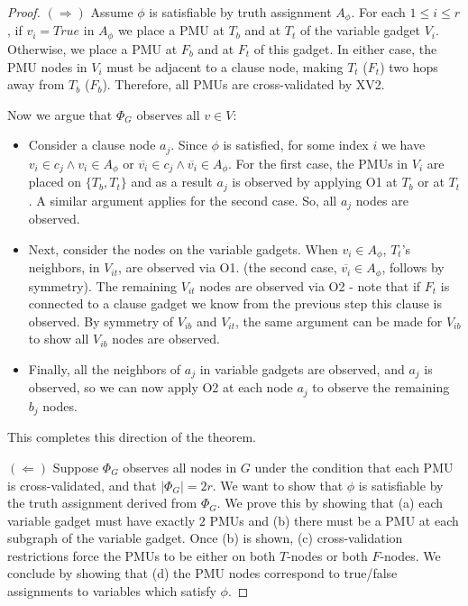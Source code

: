 \begin{proof}
$(\Rightarrow)$ Assume $\phi$ is satisfiable by truth assignment $A_{\phi}$.
For each $1\leq i\leq r$, if $v_i=True$ in $A_{\phi}$ we place a PMU at $T_b$
and at $T_t$ of the variable gadget $V_i$. Otherwise, we place a PMU at $F_b$
and at $F_t$ of this gadget. In either case, the PMU nodes in $V_i$ must be
adjacent to a clause node, making $T_t$ ($F_t$) two hops away from
$T_b$ ($F_b$). Therefore, all PMUs are cross-validated by XV2. 

Now we argue that $\Phi_G$ observes all $v \in V$:  
\begin{itemize}
  \item Consider a clause node $a_j$. Since $\phi$ is satisfied, for some
  index $i$ we have  $v_i \in c_j \wedge v_i\in A_{\phi}$ or $\overline{v_i} \in
  c_j \wedge \overline{v_i}\in A_{\phi}$. For the first case, the PMUs in $V_i$ are placed
  on $\{T_b, T_t\}$ and as a result $a_j$ is observed by applying O1 at $T_b$ or at  $T_t$. A similar argument applies for the second case. So, all $a_j$
  nodes are observed.

  \item Next, consider the nodes on the variable gadgets.  When $v_i \in A_{\phi}$,
  $T_t$'s neighbors, in $V_{it}$, are observed via O1.
  (the second case, $\overline{v_i} \in A_{\phi}$, follows by symmetry). 
  The remaining $V_{it}$ nodes are observed via O2 - note that if $F_t$ is connected to a clause gadget we know from the previous step this clause is observed. By symmetry of $V_{ib}$ and
  $V_{it}$, the same argument can be made for $V_{ib}$ to show all $V_{ib}$ nodes
  are observed.

 \item Finally, all the neighbors of $a_j$ in variable gadgets are observed, and $a_j$ is observed, so we can now apply O2 at each node $a_j$ to observe the remaining $b_j$ nodes.
\end{itemize}
This completes this direction of the theorem.

$(\Leftarrow)$ Suppose $\Phi_G$ observes all nodes in $G$
under the condition that each PMU is cross-validated, and that $|\Phi_G|=2r$. We want to show that
$\phi$ is satisfiable by the truth assignment derived from $\Phi_G$. We prove this by showing
that (a) each variable gadget must have exactly $2$ PMUs and (b) there must be
a PMU at each subgraph of the variable gadget. Once (b) is shown, (c)
cross-validation restrictions force the PMUs to be either on both
$T$-nodes or both $F$-nodes. We conclude by showing that (d) the PMU nodes correspond
to true/false assignments to variables which satisfy $\phi$.


\end{proof}
